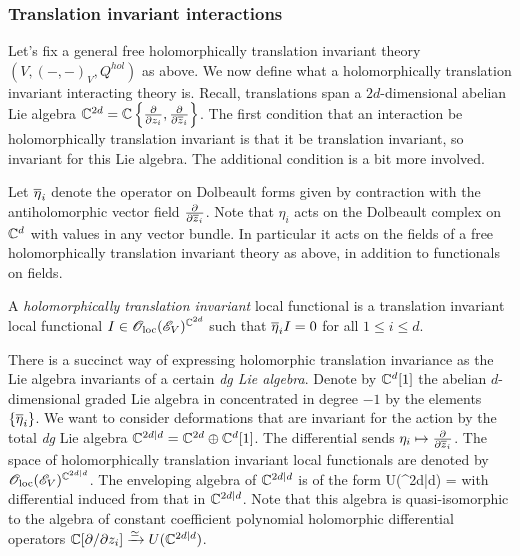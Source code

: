 \documentclass[11pt]{amsart}
\begin{document}
\subsubsection{Translation invariant interactions}


Let's fix a general free holomorphically translation invariant theory $(V, (-,-)_V, Q^{hol})$ as above.
We now define what a holomorphically translation invariant interacting theory is.
Recall, translations span a $2d$-dimensional abelian Lie algebra $\CC^{2d} = \CC\left\{\frac{\partial}{\partial z_i}, \frac{\partial}{\partial \zbar_i}\right\}$. 
The first condition that an interaction be holomorphically translation invariant is that it be translation invariant, so invariant for this Lie algebra.
The additional condition is a bit more involved.

Let $\Bar{\eta}_i$ denote the operator on Dolbeault forms given by contraction with the antiholomorphic vector field $\frac{\partial}{\partial \zbar_i}$. 
Note that $\eta_i$ acts on the Dolbeault complex on $\CC^d$ with values in any vector bundle.
In particular it acts on the fields of a free holomorphically translation invariant theory as above, in addition to functionals on fields.

\begin{dfn}
A {\em holomorphically translation invariant} local functional is a translation invariant local functional $I \in \oloc(\sE_V)^{\CC^{2d}}$ such that $\Bar{\eta}_i I = 0$ for all $1 \leq i \leq d$. 
\end{dfn}

There is a succinct way of expressing holomorphic translation invariance as the Lie algebra invariants of a certain {\em dg Lie algebra}.
Denote by $\CC^d[1]$ the abelian $d$-dimensional graded Lie algebra in concentrated in degree $-1$ by the elements $\{\Bar{\eta}_i\}$.
We want to consider deformations that are invariant for the action by the total {\em dg} Lie algebra $\CC^{2d|d} = \CC^{2d} \oplus \CC^d[1]$.
The differential sends $\eta_i \mapsto \frac{\partial}{\partial \zbar_i}$.
The space of holomorphically translation invariant local functionals are denoted by $\oloc(\sE_V)^{\CC^{2d|d}}$.
The enveloping algebra of $\CC^{2d|d}$ is of the form
\ben
U(\CC^{2d|d}) = \CC {}
\een
with differential induced from that in $\CC^{2d|d}$. 
Note that this algebra is quasi-isomorphic to the algebra of constant coefficient polynomial holomorphic differential operators $\CC[\partial / \partial z_i] \xto{\simeq} U(\CC^{2d|d})$. 
\end{document}
